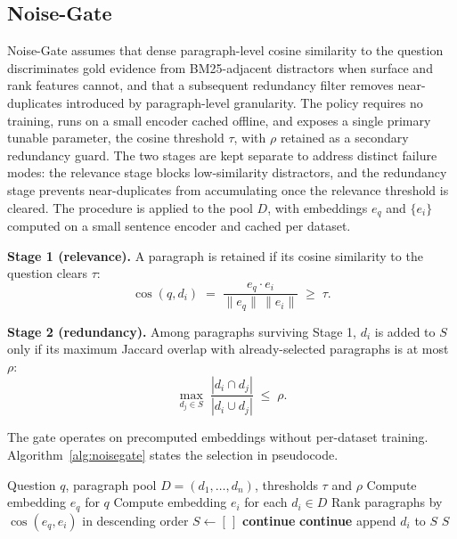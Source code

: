 \documentclass[runningheads]{llncs}
\begin{document}
\subsection{Noise-Gate}
\label{subsec:methods_noisegate}

Noise-Gate assumes that dense paragraph-level cosine similarity to the question discriminates gold evidence from BM25-adjacent distractors when surface and rank features cannot, and that a subsequent redundancy filter removes near-duplicates introduced by paragraph-level granularity. The policy requires no training, runs on a small encoder cached offline, and exposes a single primary tunable parameter, the cosine threshold $\tau$, with $\rho$ retained as a secondary redundancy guard. The two stages are kept separate to address distinct failure modes: the relevance stage blocks low-similarity distractors, and the redundancy stage prevents near-duplicates from accumulating once the relevance threshold is cleared. The procedure is applied to the pool $D$, with embeddings $e_q$ and $\{e_i\}$ computed on a small sentence encoder and cached per dataset.

\textbf{Stage 1 (relevance).} A paragraph is retained if its cosine similarity to the question clears $\tau$:
\begin{equation}
\label{eq:cos}
\cos(q, d_i) \;=\; \frac{e_q \cdot e_i}{\|e_q\|\,\|e_i\|} \;\ge\; \tau.
\end{equation}

\textbf{Stage 2 (redundancy).} Among paragraphs surviving Stage 1, $d_i$ is added to $S$ only if its maximum Jaccard overlap with already-selected paragraphs is at most $\rho$:
\begin{equation}
\label{eq:jaccard}
\max_{d_j \in S}\;\frac{|d_i \cap d_j|}{|d_i \cup d_j|} \;\le\; \rho.
\end{equation}

The gate operates on precomputed embeddings without per-dataset training. Algorithm~\ref{alg:noisegate} states the selection in pseudocode.

\begin{algorithm}[t]
\caption{Noise-Gate context selection.}
\label{alg:noisegate}
\begin{algorithmic}[1]
\Require Question $q$, paragraph pool $D=(d_1,\dots,d_n)$, thresholds $\tau$ and $\rho$
\State Compute embedding $e_q$ for $q$
\State Compute embedding $e_i$ for each $d_i \in D$
\State Rank paragraphs by $\cos(e_q, e_i)$ in descending order
\State $S \leftarrow [\,]$
        \State \textbf{continue}
    \EndIf
        \State \textbf{continue}
    \EndIf
    \State append $d_i$ to $S$
\EndFor
\State \Return $S$
\end{algorithmic}
\end{algorithm}
\end{document}
